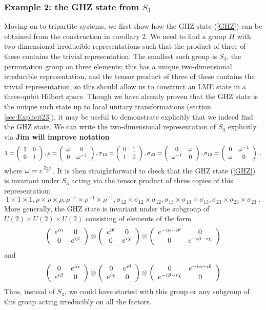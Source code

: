 \documentclass[12pt]{article}
\theoremstyle{definition}
\newcommand{\be}{\begin{equation}}
\newcommand{\ee}{\end{equation}}
\newcommand{\ba}{\begin{array}}
\newcommand{\ea}{\end{array}}
\begin{document}
\subsubsection*{Example 2: the GHZ state from $S_3$}

Moving on to tripartite systems, we first show how the GHZ state (\ref{GHZ}) can be obtained from the construction in corollary 2. We need to find a group $H$ with two-dimensional irreducible representations such that the product of three of these contains the trivial representation. The smallest such group is $S_3$, the permutation group on three elements; this has a unique two-dimensional irreducible representation, and the tensor product of three of these contains the trivial representation, so this should allow us to construct an LME state in a three-qubit Hilbert space. Though we have already proven that the GHZ state is the unique such state up to local unitary transformations (section \ref{sec:Explicit23}), it may be useful to demonstrate explicitly that we indeed find the GHZ state. We can write the two-dimensional representation of $S_3$ explicitly via {\bf Jim will improve notation}
\be
\label{S3rep}
1 = \left( \ba{cc} 1 & 0  \cr 0 & 1 \ea \right), \rho = \left( \ba{cc} \omega & 0  \cr 0 & \omega^{-1} \ea \right), \sigma_{12} = \left( \ba{cc} 0 & 1  \cr 1 & 0 \ea \right), \sigma_{23} = \left( \ba{cc} 0 & \omega  \cr \omega^{-1} & 0 \ea \right), \sigma_{12} = \left( \ba{cc} 0 & \omega^{-1}  \cr \omega & 0 \ea \right) \; .
\ee
where $\omega = e^{2 \pi i \over 3}$. It is then straightforward to check that the GHZ state (\ref{GHZ}) is invariant under $S_3$ acting via the tensor product of three copies of this representation:
\be
1 \times 1 \times 1, \rho \times \rho \times \rho, \rho^{-1} \times \rho^{-1} \times \rho^{-1}, \sigma_{12} \times \sigma_{12} \times \sigma_{12}, \sigma_{13} \times \sigma_{13} \times \sigma_{13},\sigma_{23} \times \sigma_{23} \times \sigma_{23}\; .
\ee
More generally, the GHZ state is invariant under the subgroup of $U(2) \times U(2) \times U(2)$ consisting of elements of the form
\be
\left( \ba{cc} e^{i \alpha} & 0 \cr 0 & e^{i \beta} \ea \right) \otimes \left( \ba{cc} e^{i \theta} & 0 \cr 0 & e^{i \chi} \ea \right) \otimes \left( \ba{cc} e^{-i \alpha - i \theta} & 0 \cr 0 & e^{-i \beta - i \chi} \ea \right)
\ee
and
\be
\left( \ba{cc} 0 & e^{i \alpha}  \cr e^{i \beta} & 0 \ea \right) \otimes \left( \ba{cc} 0 & e^{i \theta}  \cr e^{i \chi} & 0 \ea \right) \otimes \left( \ba{cc} 0 & e^{-i \alpha - i \theta} \cr  e^{-i \beta - i \chi} & 0 \ea \right)
\ee
Thus, instead of $S_3$, we could have started with this group or any subgroup of this group acting irreducibly on all the factors.
\end{document}
